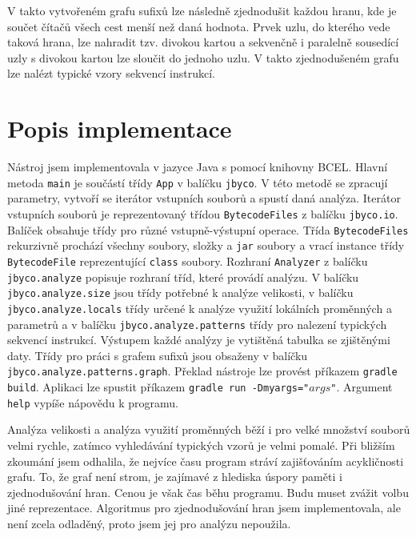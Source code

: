 V takto vytvořeném grafu sufixů lze následně zjednodušit každou hranu, kde je součet čítačů všech cest menší než daná hodnota. Prvek uzlu, do kterého vede taková hrana, lze nahradit tzv. divokou kartou a sekvenčně i paralelně sousedící uzly s divokou kartou lze sloučit do jednoho uzlu. V takto zjednodušeném grafu lze nalézt typické vzory sekvencí instrukcí.

\section{Popis implementace}\label{ToolImplementation}

Nástroj jsem implementovala v jazyce Java s pomocí knihovny BCEL. Hlavní metoda \texttt{main} je součástí třídy \texttt{App} v balíčku \texttt{jbyco}. V této metodě se zpracují parametry, vytvoří se iterátor vstupních souborů a spustí daná analýza. Iterátor vstupních souborů je reprezentovaný třídou \texttt{BytecodeFiles} z balíčku \texttt{jbyco.io}. Balíček obsahuje třídy pro různé vstupně-výstupní operace. Třída  \texttt{BytecodeFiles} rekurzivně prochází všechny soubory, složky a \texttt{jar} soubory a vrací instance třídy \texttt{BytecodeFile} reprezentující \texttt{class} soubory. Rozhraní \texttt{Analyzer} z balíčku \texttt{jbyco.analyze} popisuje rozhraní tříd, které provádí analýzu. V balíčku \texttt{jbyco.analyze.size} jsou třídy potřebné k analýze velikosti, v balíčku \texttt{jbyco.analyze.locals} třídy určené k analýze využití lokálních proměnných a parametrů a v balíčku
\texttt{jbyco.analyze.patterns} třídy pro nalezení typických sekvencí instrukcí. Výstupem každé analýzy je vytištěná tabulka se zjištěnými daty. Třídy pro práci s grafem sufixů jsou obsaženy v balíčku \texttt{jbyco.analyze.patterns.graph}.
Překlad nástroje lze provést příkazem \texttt{gradle build}. Aplikaci lze spustit příkazem \texttt{gradle run -Dmyargs="$args$"}. Argument \texttt{help} vypíše nápovědu k programu.

Analýza velikosti a analýza využití proměnných běží i pro velké množství souborů velmi rychle, zatímco vyhledávání typických vzorů je velmi pomalé. Při bližším zkoumání jsem odhalila, že nejvíce času program stráví zajišťováním acykličnosti grafu. To, že graf není strom, je zajímavé z hlediska úspory paměti i zjednodušování hran. Cenou je však čas běhu programu. Budu muset zvážit volbu jiné reprezentace. Algoritmus pro zjednodušování hran jsem implementovala, ale není zcela odladěný, proto jsem jej pro analýzu nepoužila.


